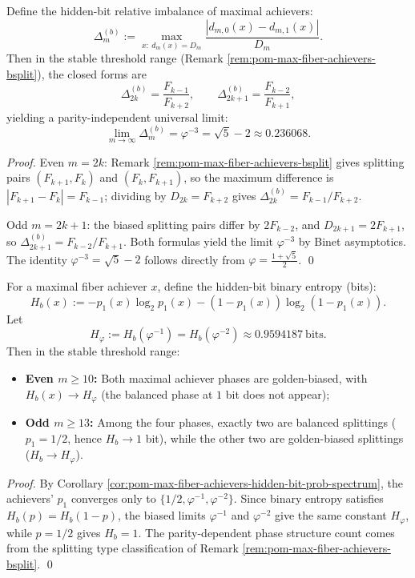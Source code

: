 \begin{corollary}\label{cor:pom-max-fiber-achievers-hidden-bit-imbalance}
Define the hidden-bit relative imbalance of maximal achievers:
\[
\Delta_m^{(b)}:=\max_{x:\ d_m(x)=D_m}\frac{|d_{m,0}(x)-d_{m,1}(x)|}{D_m}.
\]
Then in the stable threshold range (Remark \ref{rem:pom-max-fiber-achievers-bsplit}), the closed forms are
\[
\Delta_{2k}^{(b)}=\frac{F_{k-1}}{F_{k+2}},
\qquad
\Delta_{2k+1}^{(b)}=\frac{F_{k-2}}{F_{k+1}},
\]
yielding a parity-independent universal limit:
\[
\boxed{\;
\lim_{m\to\infty}\Delta_m^{(b)}=\varphi^{-3}=\sqrt5-2\approx 0.236068.
\;}
\]
\end{corollary}
\begin{proof}
Even \(m=2k\): Remark \ref{rem:pom-max-fiber-achievers-bsplit} gives splitting pairs \((F_{k+1},F_k)\) and \((F_k,F_{k+1})\), so the maximum difference is \(|F_{k+1}-F_k|=F_{k-1}\); dividing by \(D_{2k}=F_{k+2}\) gives \(\Delta_{2k}^{(b)}=F_{k-1}/F_{k+2}\).
\par
Odd \(m=2k+1\): the biased splitting pairs differ by \(2F_{k-2}\), and \(D_{2k+1}=2F_{k+1}\), so \(\Delta_{2k+1}^{(b)}=F_{k-2}/F_{k+1}\).
Both formulas yield the limit \(\varphi^{-3}\) by Binet asymptotics.
The identity \(\varphi^{-3}=\sqrt5-2\) follows directly from \(\varphi=\frac{1+\sqrt5}{2}\). \qed
\end{proof}


\begin{corollary}\label{cor:pom-max-fiber-achievers-hidden-bit-entropy}
For a maximal fiber achiever \(x\), define the hidden-bit binary entropy (bits):
\[
H_b(x):=-p_1(x)\log_2 p_1(x)-(1-p_1(x))\log_2(1-p_1(x)).
\]
Let
\[
H_\varphi:=H_b(\varphi^{-1})=H_b(\varphi^{-2})\approx 0.9594187\ \text{bits}.
\]
Then in the stable threshold range:
\begin{itemize}
  \item \textbf{Even \(m\ge 10\):} Both maximal achiever phases are golden-biased, with \(H_b(x)\to H_\varphi\) (the balanced phase at \(1\) bit does not appear);
  \item \textbf{Odd \(m\ge 13\):} Among the four phases, exactly two are balanced splittings (\(p_1=1/2\), hence \(H_b\to 1\) bit), while the other two are golden-biased splittings (\(H_b\to H_\varphi\)).
\end{itemize}
\end{corollary}
\begin{proof}
By Corollary \ref{cor:pom-max-fiber-achievers-hidden-bit-prob-spectrum}, the achievers' \(p_1\) converges only to \(\{1/2,\varphi^{-1},\varphi^{-2}\}\).
Since binary entropy satisfies \(H_b(p)=H_b(1-p)\), the biased limits \(\varphi^{-1}\) and \(\varphi^{-2}\) give the same constant \(H_\varphi\), while \(p=1/2\) gives \(H_b=1\).
The parity-dependent phase structure count comes from the splitting type classification of Remark \ref{rem:pom-max-fiber-achievers-bsplit}. \qed
\end{proof}

